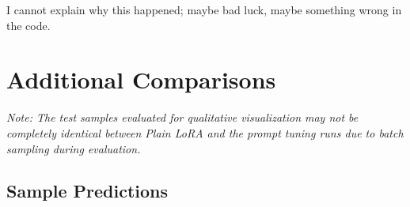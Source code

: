 \documentclass[letterpaper,11pt,leqno]{article}
\begin{document}
I cannot explain why this happened; maybe bad luck, maybe something wrong in the code.

\newpage
\section{Additional Comparisons}

\textit{Note: The test samples evaluated for qualitative visualization may not be completely identical between Plain LoRA and the prompt tuning runs due to batch sampling during evaluation.}

\subsection{Sample Predictions}
\end{document}
